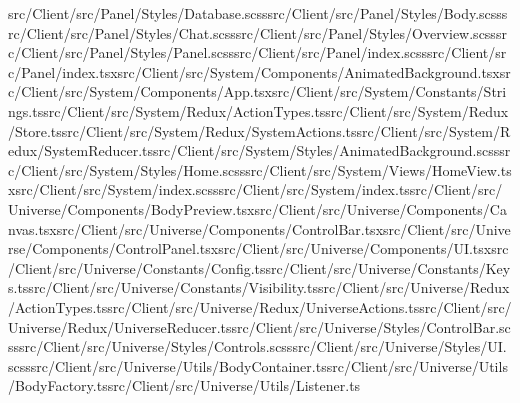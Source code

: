 \documentclass[a4paper,12pt]{article}
\begin{document}
src/Client/src/Panel/Styles/Database.scss\newline src/Client/src/Panel/Styles/Body.scss\newline src/Client/src/Panel/Styles/Chat.scss\newline src/Client/src/Panel/Styles/Overview.scss\newline src/Client/src/Panel/Styles/Panel.scss\newline src/Client/src/Panel/index.scss\newline src/Client/src/Panel/index.tsx\newline src/Client/src/System/Components/AnimatedBackground.tsx\newline src/Client/src/System/Components/App.tsx\newline src/Client/src/System/Constants/Strings.ts\newline src/Client/src/System/Redux/ActionTypes.ts\newline src/Client/src/System/Redux/Store.ts\newline src/Client/src/System/Redux/SystemActions.ts\newline src/Client/src/System/Redux/SystemReducer.ts\newline src/Client/src/System/Styles/AnimatedBackground.scss\newline src/Client/src/System/Styles/Home.scss\newline src/Client/src/System/Views/HomeView.tsx\newline src/Client/src/System/index.scss\newline src/Client/src/System/index.ts\newline src/Client/src/Universe/Components/BodyPreview.tsx\newline src/Client/src/Universe/Components/Canvas.tsx\newline src/Client/src/Universe/Components/ControlBar.tsx\newline src/Client/src/Universe/Components/ControlPanel.tsx\newline src/Client/src/Universe/Components/UI.tsx\newline src/Client/src/Universe/Constants/Config.ts\newline src/Client/src/Universe/Constants/Keys.ts\newline src/Client/src/Universe/Constants/Visibility.ts\newline src/Client/src/Universe/Redux/ActionTypes.ts\newline src/Client/src/Universe/Redux/UniverseActions.ts\newline src/Client/src/Universe/Redux/UniverseReducer.ts\newline src/Client/src/Universe/Styles/ControlBar.scss\newline src/Client/src/Universe/Styles/Controls.scss\newline src/Client/src/Universe/Styles/UI.scss\newline src/Client/src/Universe/Utils/BodyContainer.ts\newline src/Client/src/Universe/Utils/BodyFactory.ts\newline src/Client/src/Universe/Utils/Listener.ts\newline 
\end{document}
